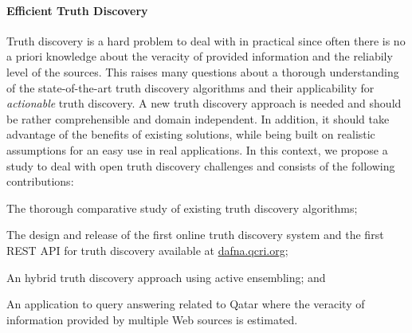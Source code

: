 \documentclass[paper=a4, fontsize=11pt]{scrartcl}	%
\numberwithin{equation}{section}															%
\numberwithin{figure}{section}																%
\numberwithin{table}{section}																%
\begin{document}
 \paragraph*{Efficient Truth Discovery}Truth discovery is a hard problem to deal with in practical since often there is no a priori knowledge about the veracity of provided 
 information and the reliabily level of the sources. This raises many questions about a thorough understanding of the state-of-the-art truth discovery algorithms and their applicability
 for \emph{actionable} truth discovery. A new truth discovery approach is needed and should be rather comprehensible and domain independent. In addition, it should take advantage of the 
 benefits of existing solutions, while being built on realistic assumptions for an easy use in real applications. In this context, we propose a study to deal with open truth discovery challenges 
 and consists of the following contributions:
 \begin{inparaenum}[(i)]
  \item The thorough comparative study of existing truth discovery algorithms;
  \item The design and release of the first online truth discovery system and 
  the first REST API for truth discovery available at \url{dafna.qcri.org};
  \item An hybrid truth discovery approach using active ensembling; and 
  \item An application to query answering related to Qatar where the veracity of information provided by multiple Web sources is estimated.
 \end{inparaenum}
 
\end{document}
